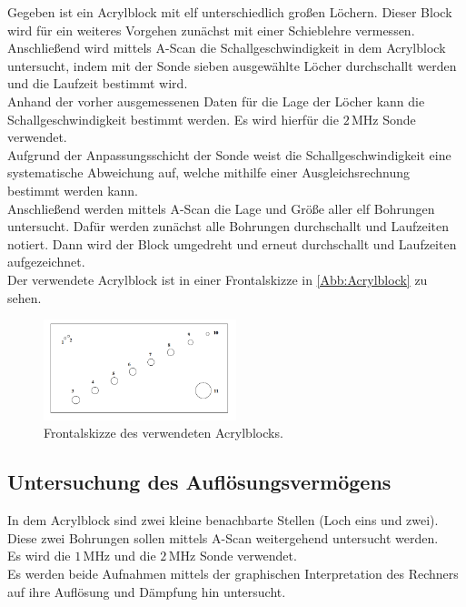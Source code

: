 Gegeben ist ein Acrylblock mit elf unterschiedlich großen Löchern.
Dieser Block wird für ein weiteres Vorgehen zunächst mit einer Schieblehre
vermessen.\\
Anschließend wird mittels A-Scan die Schallgeschwindigkeit in dem 
Acrylblock untersucht, indem mit der Sonde sieben ausgewählte Löcher
durchschallt werden und die Laufzeit bestimmt wird.\\
Anhand der vorher
ausgemessenen Daten für die Lage der Löcher kann die Schallgeschwindigkeit
bestimmt werden. Es wird hierfür die $2 \, \si{\mega\hertz}$ Sonde verwendet.\\
Aufgrund der Anpassungsschicht der Sonde weist die Schallgeschwindigkeit eine
systematische Abweichung auf, welche mithilfe einer Ausgleichsrechnung
bestimmt werden kann.\\
Anschließend werden mittels A-Scan die Lage und Größe aller elf Bohrungen
untersucht. Dafür werden zunächst alle Bohrungen durchschallt und Laufzeiten
notiert. Dann wird der Block umgedreht und erneut durchschallt und Laufzeiten 
aufgezeichnet.\\
Der verwendete Acrylblock ist in einer Frontalskizze in \autoref{Abb:Acrylblock} zu sehen.

\begin{figure}
    \centering
    \includegraphics[width=0.5\textwidth]{messwerte/Acrylblock.png}
    \caption{Frontalskizze des verwendeten Acrylblocks.}
    \label{Abb:Acrylblock}
\end{figure}

\subsection{Untersuchung des Auflösungsvermögens}

In dem Acrylblock sind zwei kleine benachbarte Stellen (Loch eins und zwei).
Diese zwei Bohrungen sollen mittels A-Scan weitergehend untersucht werden.\\
Es wird die $1 \, \si{\mega\hertz}$ und die $2 \, \si{\mega\hertz}$
Sonde verwendet.\\
Es werden beide Aufnahmen mittels der graphischen Interpretation
des Rechners auf ihre Auflösung und Dämpfung hin untersucht.\\

